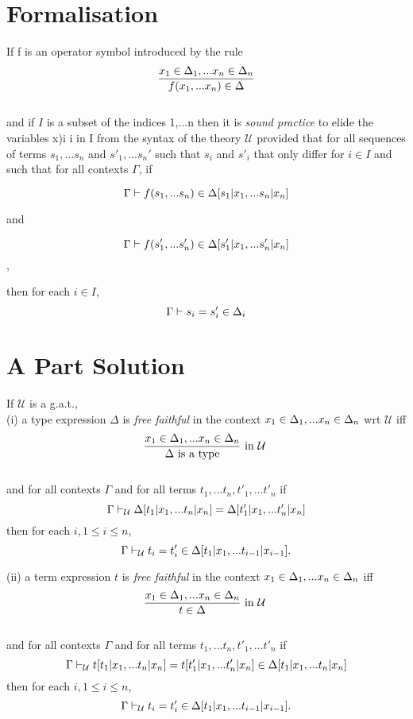 \documentclass[10pt,a4paper,fleqn]{article}
\newcommand{\gat}[1][U]{
\ensuremath{\mathcal{#1}} }
\newcommand{\isagat}[1][U]{\gat[#1] is a g.a.t.}
\begin{document}
\section{Formalisation}
\begin{definition}
If f is an operator symbol introduced by the rule  \\
$$\frac{x_1 \in \Delta_1,... x_{n} \in \Delta_{n}}{f(x_1,...x_n) \in \Delta}$$ \\

and if $I$ is a subset of the indices {1,...n} then it is \textit{sound practice} to elide the variables x)i i in I from the syntax of the theory \gat provided that 
 for all sequences of terms $s_1,...s_n$ and
$s'_1,...s_n'$ such that $s_i$ and $s'_i$ that only differ for $i \in I$ and such that for all  contexts $\Gamma$, if 

$$\Gamma  \vdash f(s_1,...s_n) \in \Delta[s_1|x_1,...s_n|x_n]$$

and 

$$\Gamma  \vdash f(s'_1,...s'_n) \in \Delta[s'_1|x_1,...s'_n|x_n]$$,

then for each $i \in I$,
$$\Gamma  \vdash s_i = s'_i \in \Delta_i$$
\end{definition}



\section{A Part Solution}

\begin{definition}
If \isagat, \\

\noindent
(i)  a type expression $\Delta$ is \textit{free faithful} in the context $x_1 \in \Delta_1,... x_{n} \in \Delta_{n}$
wrt \gat iff 
$$\frac{\schmcon{x}{\Delta}{n}}{\isT{\Delta}} \mbox{ in \gat} $$ \\
\noindent 
and for all contexts $\Gamma$ and for all terms $t_1,...t_n, t'_1,...t'_n$ if \\
$$\Gamma  \tstyle_{\gat} \Delta[t_1|x_1,...t_n|x_n]=\Delta[t'_1|x_1,...t'_n|x_n]$$
then for each $i, 1 \leq i \leq n$,
$$\Gamma  \tstyle_{\gat} t_i = t'_i \in  \Delta[t_1|x_1,...t_{i-1}|x_{i-1}].$$

\noindent
(ii) a term expression $t$ is \textit{free faithful} in the context $x_1 \in \Delta_1,... x_{n} \in \Delta_{n}$ iff 
$$\frac{\schmcon{x}{\Delta}{n}}{\ofT{t}{\Delta}} \mbox{ in \gat} $$ \\
\noindent 
and for all contexts $\Gamma$ and for all terms $t_1,...t_n, t'_1,...t'_n$ if \\
$$\Gamma  \tstyle_{\gat} t[t_1|x_1,...t_n|x_n]=t[t'_1|x_1,...t'_n|x_n] \in \Delta[t_1|x_1,...t_n|x_n]  $$
then for each $i, 1 \leq i \leq n$,
$$\Gamma  \tstyle_{\gat} t_i = t'_i \in  \Delta[t_1|x_1,...t_{i-1}|x_{i-1}].$$

\end{definition}
\end{document}
